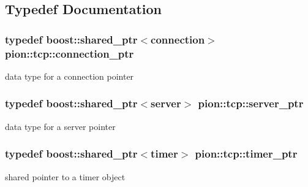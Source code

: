 \subsection{Typedef Documentation}
\hypertarget{namespacepion_1_1tcp_a6c9b7497068009f6d81d95ec0b0627d6}{
\subsubsection[{connection\-\_\-ptr}]{\setlength{\rightskip}{0pt plus 5cm}typedef boost\-::shared\-\_\-ptr$<${\bf connection}$>$ {\bf pion\-::tcp\-::connection\-\_\-ptr}}}\label{namespacepion_1_1tcp_a6c9b7497068009f6d81d95ec0b0627d6}


data type for a connection pointer 

\hypertarget{namespacepion_1_1tcp_abdb69244f6c6f16c8c5f9b759819df8f}{
\subsubsection[{server\-\_\-ptr}]{\setlength{\rightskip}{0pt plus 5cm}typedef boost\-::shared\-\_\-ptr$<${\bf server}$>$ {\bf pion\-::tcp\-::server\-\_\-ptr}}}\label{namespacepion_1_1tcp_abdb69244f6c6f16c8c5f9b759819df8f}


data type for a server pointer 

\hypertarget{namespacepion_1_1tcp_a5f0d9ecf54fb010fab5847b8e4519847}{
\subsubsection[{timer\-\_\-ptr}]{\setlength{\rightskip}{0pt plus 5cm}typedef boost\-::shared\-\_\-ptr$<${\bf timer}$>$ {\bf pion\-::tcp\-::timer\-\_\-ptr}}}\label{namespacepion_1_1tcp_a5f0d9ecf54fb010fab5847b8e4519847}


shared pointer to a timer object 

